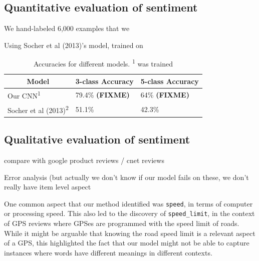 \documentclass{article} %
\begin{document}


\subsection{Quantitative evaluation of sentiment}

We hand-labeled 6,000 examples that we 

Using Socher et al (2013)'s model, trained on 

\begin{table}[t]
\begin{center}
\begin{tabular}{lll}
\multicolumn{1}{c}{\bf Model}  &\multicolumn{1}{c}{\bf 3-class Accuracy} &\multicolumn{1}{c}{\bf 5-class Accuracy} \\ \hline
 Our CNN\textsuperscript{1} & 79.4\% \textbf{(FIXME)} & 64\% \textbf{(FIXME)} \\
 Socher et al (2013)\textsuperscript{2}       & 51.1\% & 42.3\% \\
\end{tabular}
\end{center}
\caption{Accuracies for different models. \textsuperscript{1} was trained}
\label{ModelResultsTable}
\end{table}



\subsection{Qualitative evaluation of sentiment}

compare with google product reviews / cnet reviews

Error analysis (but actually we don't know if our model fails on these, we don't really have item level aspect

One common aspect that our method identified was \texttt{speed}, in terms of computer or processing speed. This also led to the discovery of \texttt{speed\_limit}, in the context of GPS reviews where GPSes are programmed with the speed limit of roads. While it might be arguable that knowing the road speed limit is a relevant aspect of a GPS, this highlighted the fact that our model might not be able to capture instances where words have different meanings in different contexts.
\end{document}
